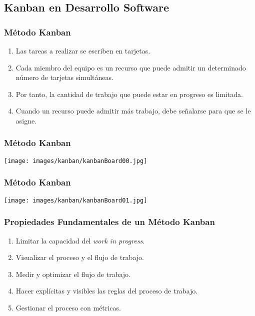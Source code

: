 \documentclass[animated,a4paper,slidestop,xcolor=pst,blue]{beamer}
\begin{document}
\subsection{Kanban en Desarrollo Software}

\begin{frame}[c]
    \frametitle{Método Kanban}
    \begin{enumerate}[<+->]
        \item Las tareas a realizar se escriben en tarjetas.
        \item Cada miembro del equipo es un recurso que puede admitir un determinado número de tarjetas simultáneas.
        \item Por tanto, \alert{la cantidad de trabajo que puede estar en progreso es limitada}.
        \item Cuando un recurso puede admitir más trabajo, debe señalarse para que se le asigne.
    \end{enumerate}
\end{frame}

\begin{frame}[c]
	\frametitle{Método Kanban}
    \begin{center}
        \texttt{[image: images/kanban/kanbanBoard00.jpg]}
    \end{center}
\end{frame}

\begin{frame}[c]
	\frametitle{Método Kanban}
    \begin{center}
        \texttt{[image: images/kanban/kanbanBoard01.jpg]}
    \end{center}
\end{frame}

\begin{frame}[c]
	\frametitle{Propiedades Fundamentales de un Método Kanban}
    \begin{enumerate}[<+->]
        \item Limitar la capacidad del \emph{work in progress}.
        \item Visualizar el proceso y el flujo de trabajo.
        \item Medir y optimizar el flujo de trabajo.
        \item Hacer explícitas y visibles las reglas del proceso de trabajo.
        \item Gestionar el proceso con métricas.
    \end{enumerate}
\end{frame}
\end{document}

